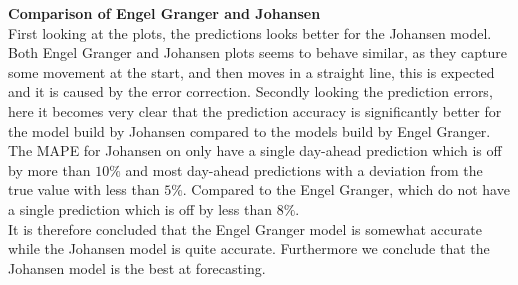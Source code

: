 \noindent \textbf{Comparison of Engel Granger and Johansen}\\

\noindent First looking at the plots, the predictions looks better for the Johansen model. Both Engel Granger and Johansen plots seems to behave similar, as they capture some movement at the start, and then moves in a straight line, this is expected and it is caused by the error correction.
Secondly looking the prediction errors, here it becomes very clear that the prediction accuracy is significantly better for the model build by Johansen compared to the models build by Engel Granger. The MAPE for Johansen on only have a single day-ahead prediction which is off by more than $10\%$ and most day-ahead predictions with a deviation from the true value with less than $5\%$. Compared to the Engel Granger, which do not have a single prediction which is off by less than $8\%$.\\
It is therefore concluded that the Engel Granger model is somewhat accurate while the Johansen model is quite accurate. Furthermore we conclude that the Johansen model is the best at forecasting.